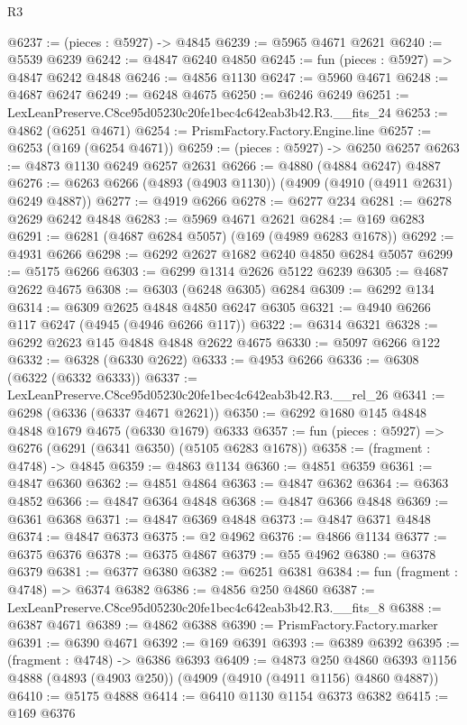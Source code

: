 \begin{lexlean}{R3}
\begin{coremodule}
@6237 := (pieces : @5927) -> @4845
@6239 := @5965 @4671 @2621
@6240 := @5539 @6239
@6242 := @4847 @6240 @4850
@6245 := fun (pieces : @5927) => @4847 @6242 @4848
@6246 := @4856 @1130
@6247 := @5960 @4671
@6248 := @4687 @6247
@6249 := @6248 @4675
@6250 := @6246 @6249
@6251 := LexLeanPreserve.C8ce95d05230c20fe1bec4c642eab3b42.R3.__fits_24
@6253 := @4862 (@6251 @4671)
@6254 := PrismFactory.Factory.Engine.line
@6257 := @6253 (@169 (@6254 @4671))
@6259 := (pieces : @5927) -> @6250 @6257
@6263 := @4873 @1130 @6249 @6257 @2631
@6266 := @4880 (@4884 @6247) @4887
@6276 := @6263 @6266 (@4893 (@4903 @1130)) (@4909 (@4910 (@4911 @2631) @6249 @4887))
@6277 := @4919 @6266
@6278 := @6277 @234
@6281 := @6278 @2629 @6242 @4848
@6283 := @5969 @4671 @2621
@6284 := @169 @6283
@6291 := @6281 (@4687 @6284 @5057) (@169 (@4989 @6283 @1678))
@6292 := @4931 @6266
@6298 := @6292 @2627 @1682 @6240 @4850 @6284 @5057
@6299 := @5175 @6266
@6303 := @6299 @1314 @2626 @5122 @6239
@6305 := @4687 @2622 @4675
@6308 := @6303 (@6248 @6305) @6284
@6309 := @6292 @134
@6314 := @6309 @2625 @4848 @4850 @6247 @6305
@6321 := @4940 @6266 @117 @6247 (@4945 (@4946 @6266 @117))
@6322 := @6314 @6321
@6328 := @6292 @2623 @145 @4848 @4848 @2622 @4675
@6330 := @5097 @6266 @122
@6332 := @6328 (@6330 @2622)
@6333 := @4953 @6266
@6336 := @6308 (@6322 (@6332 @6333))
@6337 := LexLeanPreserve.C8ce95d05230c20fe1bec4c642eab3b42.R3.__rel_26
@6341 := @6298 (@6336 (@6337 @4671 @2621))
@6350 := @6292 @1680 @145 @4848 @4848 @1679 @4675 (@6330 @1679) @6333
@6357 := fun (pieces : @5927) => @6276 (@6291 (@6341 @6350) (@5105 @6283 @1678))
@6358 := (fragment : @4748) -> @4845
@6359 := @4863 @1134
@6360 := @4851 @6359
@6361 := @4847 @6360
@6362 := @4851 @4864
@6363 := @4847 @6362
@6364 := @6363 @4852
@6366 := @4847 @6364 @4848
@6368 := @4847 @6366 @4848
@6369 := @6361 @6368
@6371 := @4847 @6369 @4848
@6373 := @4847 @6371 @4848
@6374 := @4847 @6373
@6375 := @2 @4962
@6376 := @4866 @1134
@6377 := @6375 @6376
@6378 := @6375 @4867
@6379 := @55 @4962
@6380 := @6378 @6379
@6381 := @6377 @6380
@6382 := @6251 @6381
@6384 := fun (fragment : @4748) => @6374 @6382
@6386 := @4856 @250 @4860
@6387 := LexLeanPreserve.C8ce95d05230c20fe1bec4c642eab3b42.R3.__fits_8
@6388 := @6387 @4671
@6389 := @4862 @6388
@6390 := PrismFactory.Factory.marker
@6391 := @6390 @4671
@6392 := @169 @6391
@6393 := @6389 @6392
@6395 := (fragment : @4748) -> @6386 @6393
@6409 := @4873
    @250
    @4860
    @6393
    @1156
    @4888
    (@4893 (@4903 @250))
    (@4909 (@4910 (@4911 @1156) @4860 @4887))
@6410 := @5175 @4888
@6414 := @6410 @1130 @1154 @6373 @6382
@6415 := @169 @6376

\end{coremodule}
\end{lexlean}

